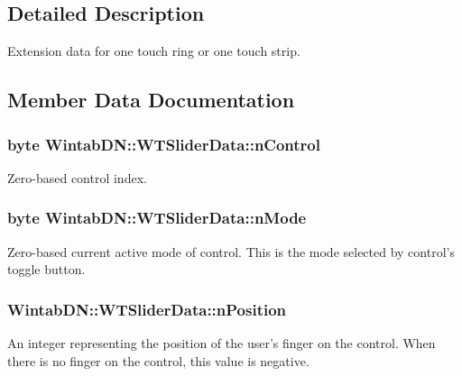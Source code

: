 \subsection{Detailed Description}
Extension data for one touch ring or one touch strip. 

\subsection{Member Data Documentation}
\hypertarget{struct_wintab_d_n_1_1_w_t_slider_data_a6e9b0e2000225460c886bcd723ae2513}{
\subsubsection[{nControl}]{\setlength{\rightskip}{0pt plus 5cm}byte {\bf WintabDN::WTSliderData::nControl}}}
\label{struct_wintab_d_n_1_1_w_t_slider_data_a6e9b0e2000225460c886bcd723ae2513}


Zero-\/based control index. 

\hypertarget{struct_wintab_d_n_1_1_w_t_slider_data_ae53b13eec56536783d9ce573edb39ceb}{
\subsubsection[{nMode}]{\setlength{\rightskip}{0pt plus 5cm}byte {\bf WintabDN::WTSliderData::nMode}}}
\label{struct_wintab_d_n_1_1_w_t_slider_data_ae53b13eec56536783d9ce573edb39ceb}


Zero-\/based current active mode of control. This is the mode selected by control's toggle button. 

\hypertarget{struct_wintab_d_n_1_1_w_t_slider_data_a3dd27592829cec27d5e117a192a0747a}{
\subsubsection[{nPosition}]{ {\bf WintabDN::WTSliderData::nPosition}}}
\label{struct_wintab_d_n_1_1_w_t_slider_data_a3dd27592829cec27d5e117a192a0747a}


An integer representing the position of the user's finger on the control. When there is no finger on the control, this value is negative. 

